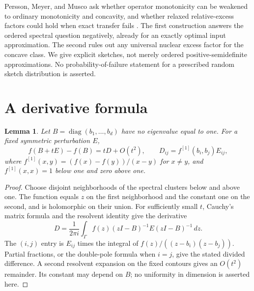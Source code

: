 \documentclass[11pt]{article}
\newtheorem{lemma}[theorem]{Lemma}
\theoremstyle{definition}
\newcommand{\diag}{\operatorname{diag}}
\begin{document}
Persson, Meyer, and Musco ask whether operator monotonicity can be weakened to ordinary monotonicity and concavity, and whether relaxed relative-excess factors could hold when exact transfer fails \cite[Table~1 and Section~5]{PMM2025}. The first construction answers the ordered spectral question negatively, already for an exactly optimal input approximation. The second rules out any universal nuclear excess factor for the concave class. We give explicit sketches, not merely ordered positive-semidefinite approximations. No probability-of-failure statement for a prescribed random sketch distribution is asserted.

\section{A derivative formula}
\begin{lemma}\label{lem:derivative}
Let $B=\diag(b_1,\ldots,b_d)$ have no eigenvalue equal to one. For a fixed symmetric perturbation $E$,
\[
 f(B+tE)-f(B)=tD+O(t^2),\qquad
 D_{ij}=f^{[1]}(b_i,b_j)E_{ij},
\]
where $f^{[1]}(x,y)=(f(x)-f(y))/(x-y)$ for $x\ne y$, and $f^{[1]}(x,x)=1$ below one and zero above one.
\end{lemma}
\begin{proof}
Choose disjoint neighborhoods of the spectral clusters below and above one. The function equals $z$ on the first neighborhood and the constant one on the second, and is holomorphic on their union. For sufficiently small $t$, Cauchy's matrix formula and the resolvent identity give the derivative
\[
 D=\frac1{2\pi i}\int_\Gamma
      f(z)(zI-B)^{-1}E(zI-B)^{-1}\,dz.
\]
The $(i,j)$ entry is $E_{ij}$ times the integral of
$f(z)/((z-b_i)(z-b_j))$. Partial fractions, or the double-pole formula when $i=j$, give the stated divided difference. A second resolvent expansion on the fixed contours gives an $O(t^2)$ remainder. Its constant may depend on $B$; no uniformity in dimension is asserted here.
\end{proof}
\end{document}

